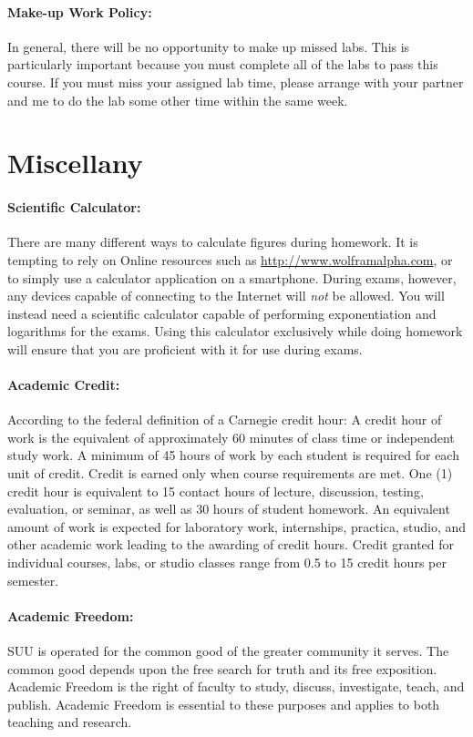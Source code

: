 \documentclass[12pt, letterpaper]{article}
\begin{document}
\paragraph{Make-up Work Policy:}
In general, there will be no opportunity to make up missed labs. This is particularly important because you must complete all of the labs to pass this course. If you must miss your assigned lab time, please arrange with your partner and me to do the lab some other time within the same week.

\section*{Miscellany}

\paragraph{Scientific Calculator:}
There are many different ways to calculate figures during homework. It is tempting to rely on Online resources such as \href{http://www.wolframalpha.com}{http://www.wolframalpha.com}, or to simply use a calculator application on a smartphone. During exams, however, any devices capable of connecting to the Internet will \emph{not} be allowed. You will instead need a scientific calculator capable of performing exponentiation and logarithms for the exams. Using this calculator exclusively while doing homework will ensure that you are proficient with it for use during exams.

\paragraph{Academic Credit:}
According to the federal definition of a Carnegie credit hour: A credit hour of work is the equivalent of approximately 60 minutes of class time or independent study work. A minimum of 45 hours of work by each student is required for each unit of credit. Credit is earned only when course requirements are met. One (1) credit hour is equivalent to 15 contact hours of lecture, discussion, testing, evaluation, or seminar, as well as 30 hours of student homework. An equivalent amount of work is expected for laboratory work, internships, practica, studio, and other academic work leading to the awarding of credit hours. Credit granted for individual courses, labs, or studio classes range from 0.5 to 15 credit hours per semester.

\paragraph{Academic Freedom:}
SUU is operated for the common good of the greater community it serves. The common good depends upon the free search for truth and its free exposition. Academic Freedom is the right of faculty to study, discuss, investigate, teach, and publish. Academic Freedom is essential to these purposes and applies to both teaching and research. 
\end{document}
